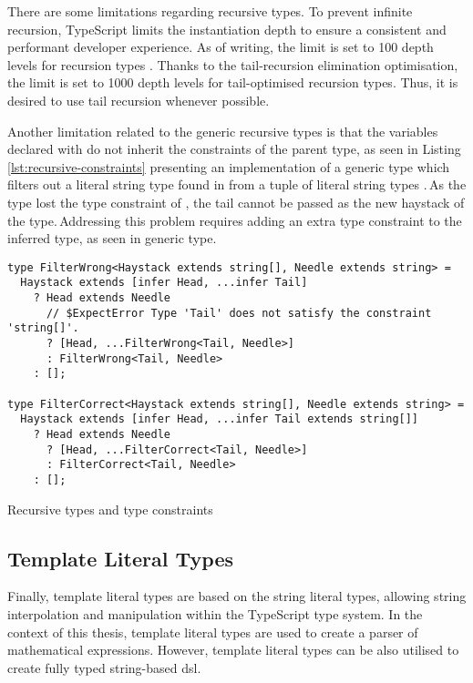 There are some limitations regarding recursive types. To prevent infinite recursion, TypeScript limits the instantiation depth to ensure a consistent and performant developer experience. As of writing, the limit is set to 100 depth levels for recursion types \cite{ImplementationCheckerTs2023}. Thanks to the tail-recursion elimination optimisation, the limit is set to 1000 depth levels for tail-optimised recursion types. Thus, it is desired to use tail recursion whenever possible.

Another limitation related to the generic recursive types is that the variables declared with  do not inherit the constraints of the parent type, as seen in Listing \ref{lst:recursive-constraints} presenting an implementation of a generic type which filters out a literal string type found in  from a tuple of literal string types .\,As the  type lost the type constraint of , the tail cannot be passed as the new haystack of the  type.\,Addressing this problem requires adding an extra type constraint to the inferred type, as seen in  generic type.

\clearpage

\begin{listing}[ht]
  \begin{verbatim}
type FilterWrong<Haystack extends string[], Needle extends string> =
  Haystack extends [infer Head, ...infer Tail]
    ? Head extends Needle
      // $ExpectError Type 'Tail' does not satisfy the constraint 'string[]'.
      ? [Head, ...FilterWrong<Tail, Needle>]
      : FilterWrong<Tail, Needle>
    : [];

type FilterCorrect<Haystack extends string[], Needle extends string> =
  Haystack extends [infer Head, ...infer Tail extends string[]]
    ? Head extends Needle
      ? [Head, ...FilterCorrect<Tail, Needle>]
      : FilterCorrect<Tail, Needle>
    : [];
\end{verbatim}
  \caption{Recursive types and type constraints}\label{lst:recursive-constraints}
\end{listing}

\subsection{Template Literal Types}

Finally, template literal types are based on the string literal types, allowing string interpolation and manipulation within the TypeScript type system. In the context of this thesis, template literal types are used to create a parser of mathematical expressions. However, template literal types can be also utilised to create fully typed string-based \acrfull{dsl}.

